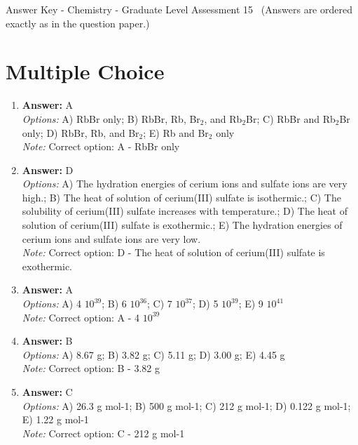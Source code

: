 \documentclass[12pt]{article}
\begin{document}
\begin{center}
Answer Key - Chemistry - Graduate Level Assessment 15 \
\small (Answers are ordered exactly as in the question paper.)
\end{center}

\section*{Multiple Choice}
\begin{enumerate}[label=\arabic*.]
\item \textbf{Answer:} A
\\ \textit{Options:} A) RbBr only; B) RbBr, Rb, Br$_{2}$, and Rb$_{2}$Br; C) RbBr and Rb$_{2}$Br only; D) RbBr, Rb, and Br$_{2}$; E) Rb and Br$_{2}$ only
\\ \textit{Note:} Correct option: A - RbBr only
\item \textbf{Answer:} D
\\ \textit{Options:} A) The hydration energies of cerium ions and sulfate ions are very high.; B) The heat of solution of cerium(III) sulfate is isothermic.; C) The solubility of cerium(III) sulfate increases with temperature.; D) The heat of solution of cerium(III) sulfate is exothermic.; E) The hydration energies of cerium ions and sulfate ions are very low.
\\ \textit{Note:} Correct option: D - The heat of solution of cerium(III) sulfate is exothermic.
\item \textbf{Answer:} A
\\ \textit{Options:} A) 4 $10^{39}$; B) 6 $10^{36}$; C) 7 $10^{37}$; D) 5 $10^{39}$; E) 9 $10^{41}$
\\ \textit{Note:} Correct option: A - 4 $10^{39}$
\item \textbf{Answer:} B
\\ \textit{Options:} A) 8.67 g; B) 3.82 g; C) 5.11 g; D) 3.00 g; E) 4.45 g
\\ \textit{Note:} Correct option: B - 3.82 g
\item \textbf{Answer:} C
\\ \textit{Options:} A) 26.3 g mol-1; B) 500 g mol-1; C) 212 g mol-1; D) 0.122 g mol-1; E) 1.22 g mol-1
\\ \textit{Note:} Correct option: C - 212 g mol-1
\end{enumerate}
\end{document}
